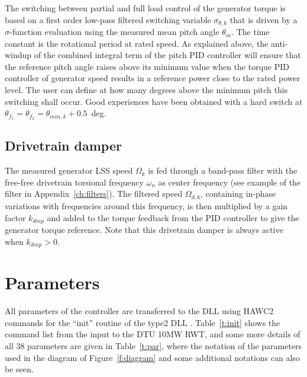 The switching between partial and full load control of the generator torque is based on a first order low-pass filtered switching variable $\sigma_{\theta,k}$ that is driven by a $\sigma$-function evaluation using the measured mean pitch angle $\theta_m$. The time constant is the rotational period at rated speed. As explained above, the anti-windup of the combined integral term of the pitch PID controller will ensure that the reference pitch angle raises above its minimum value when the torque PID controller of generator speed results in a reference power close to the rated power level. The user can define at how many degrees above the minimum pitch this switching shall occur. Good experiences have been obtained with a hard switch at $\theta_{f_1}=\theta_{f_2}=\theta_{min,k}+0.5$~deg.

\subsection{Drivetrain damper}\label{s:dmp}

The measured generator LSS speed $\Omega_k$ is fed through a band-pass filter with the free-free drivetrain torsional frequency $\omega_n$ as center frequency (see example of the filter in Appendix~\ref{ch:filters}). The filtered speed $\Omega_{d,k}$, containing in-phase variations with frequencies around this frequency, is then multiplied by a gain factor $k_{dmp}$ and added to the torque feedback from the PID controller to give the generator torque reference. Note that this drivetrain damper is always active when $k_{dmp}>0$.

\section{Parameters}\label{s:par}

All parameters of the controller are transferred to the DLL using HAWC2 commands for the ``init'' routine of the type2 DLL \cite{Larsen12}. Table~\ref{t:init} shows the command list from the input to the DTU 10MW RWT, and some more details of all 38 parameters are given in Table~\ref{t:par}, where the notation of the parameters used in the diagram of Figure~\ref{f:diagram} and some additional notations can also be seen.

